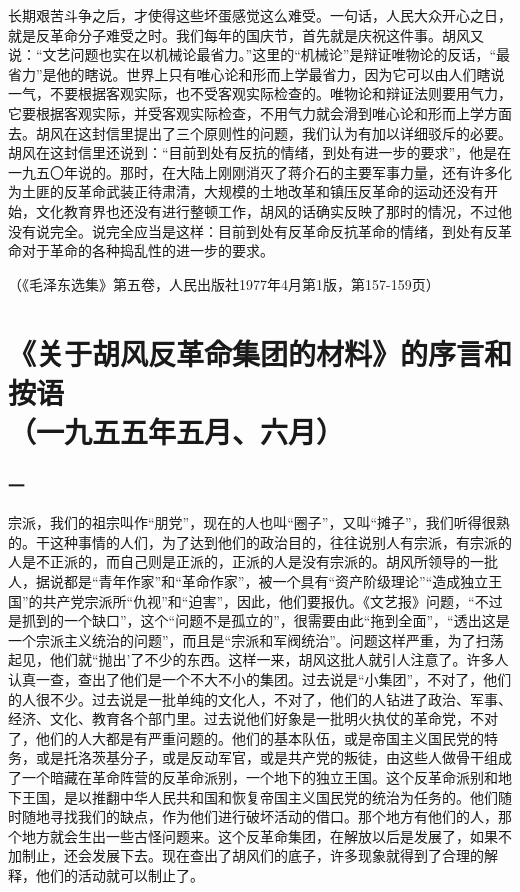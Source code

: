 \documentclass[cn,11pt,chinese]{elegantbook}
\def\myformat#1{\hfil\hfil #1}
\begin{document}
长期艰苦斗争之后，才使得这些坏蛋感觉这么难受。一句话，人民大众开心之日，就是反革命分子难受之时。我们每年的国庆节，首先就是庆祝这件事。胡风又说：“文艺问题也实在以机械论最省力。”这里的“机械论”是辩证唯物论的反话，“最省力”是他的瞎说。世界上只有唯心论和形而上学最省力，因为它可以由人们瞎说一气，不要根据客观实际，也不受客观实际检查的。唯物论和辩证法则要用气力，它要根据客观实际，并受客观实际检查，不用气力就会滑到唯心论和形而上学方面去。胡风在这封信里提出了三个原则性的问题，我们认为有加以详细驳斥的必要。胡风在这封信里还说到：“目前到处有反抗的情绪，到处有进一步的要求”，他是在一九五〇年说的。那时，在大陆上刚刚消灭了蒋介石的主要军事力量，还有许多化为土匪的反革命武装正待肃清，大规模的土地改革和镇压反革命的运动还没有开始，文化教育界也还没有进行整顿工作，胡风的话确实反映了那时的情况，不过他没有说完全。说完全应当是这样：目前到处有反革命反抗革命的情绪，到处有反革命对于革命的各种捣乱性的进一步的要求。\\
\begin{flushright}（《毛泽东选集》第五卷，人民出版社1977年4月第1版，第157-159页）\end{flushright}
\newpage\section*{\myformat{《关于胡风反革命集团的材料》的序言和按语}\\\myformat{（一九五五年五月、六月）}}
\subsubsection*{\myformat{一}}
宗派，我们的祖宗叫作“朋党”，现在的人也叫“圈子”，又叫“摊子”，我们听得很熟的。干这种事情的人们，为了达到他们的政治目的，往往说别人有宗派，有宗派的人是不正派的，而自己则是正派的，正派的人是没有宗派的。胡风所领导的一批人，据说都是“青年作家”和“革命作家”，被一个具有“资产阶级理论”“造成独立王国”的共产党宗派所“仇视”和“迫害”，因此，他们要报仇。《文艺报》问题，“不过是抓到的一个缺口”，这个“问题不是孤立的”，很需要由此“拖到全面”，“透出这是一个宗派主义统治的问题”，而且是“宗派和军阀统治”。问题这样严重，为了扫荡起见，他们就“抛出’了不少的东西。这样一来，胡风这批人就引人注意了。许多人认真一查，查出了他们是一个不大不小的集团。过去说是“小集团”，不对了，他们的人很不少。过去说是一批单纯的文化人，不对了，他们的人钻进了政治、军事、经济、文化、教育各个部门里。过去说他们好象是一批明火执仗的革命党，不对了，他们的人大都是有严重问题的。他们的基本队伍，或是帝国主义国民党的特务，或是托洛茨基分子，或是反动军官，或是共产党的叛徒，由这些人做骨干组成了一个暗藏在革命阵营的反革命派别，一个地下的独立王国。这个反革命派别和地下王国，是以推翻中华人民共和国和恢复帝国主义国民党的统治为任务的。他们随时随地寻找我们的缺点，作为他们进行破坏活动的借口。那个地方有他们的人，那个地方就会生出一些古怪问题来。这个反革命集团，在解放以后是发展了，如果不加制止，还会发展下去。现在查出了胡风们的底子，许多现象就得到了合理的解释，他们的活动就可以制止了。\\
\end{document}
